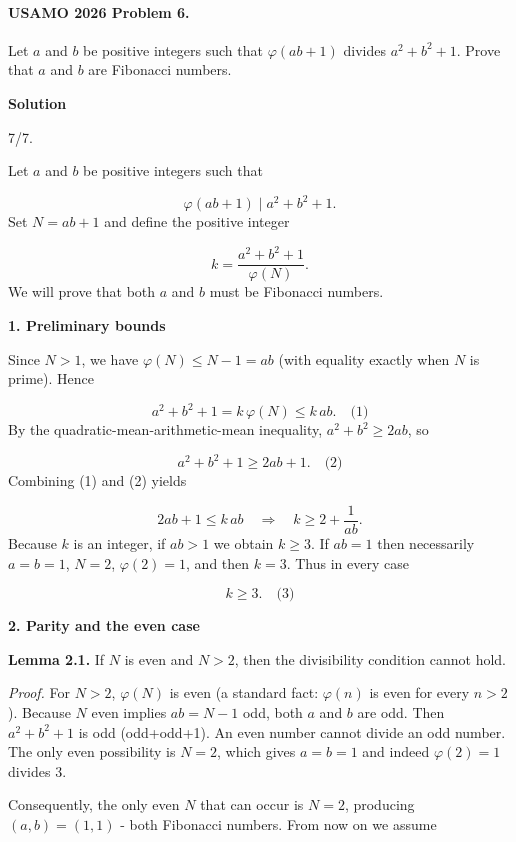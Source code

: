 \documentclass{llmxive}
\providecommand{\solutionheading}[1]{\par\smallskip\noindent\textbf{#1}\par}
\begin{document}
\paragraph{USAMO 2026 Problem 6.}
\begin{mdframed}[style=mdpurplebox,frametitle={USAMO 2026 Problem 6}]
Let $a$ and $b$ be positive integers such that $\varphi(ab+1)$ divides $a^2 + b^2 + 1$. Prove that $a$ and $b$ are Fibonacci numbers.
\end{mdframed}
\solutionheading{Solution}
\begin{remark*}
  7/7.
\end{remark*}
Let \(a\) and \(b\) be positive integers such that\par
\[
\varphi(ab+1) \mid a^{2}+b^{2}+1.
\]
Set \(N = ab+1\) and define the positive integer\par
\[
k = \frac{a^{2}+b^{2}+1}{\varphi(N)}.
\]
We will prove that both \(a\) and \(b\) must be Fibonacci numbers.\par
\smallskip
\solutionheading{1. Preliminary bounds}
Since \(N > 1\), we have \(\varphi(N) \le N-1 = ab\) (with equality exactly when \(N\) is prime). Hence\par
\[
a^{2}+b^{2}+1 = k\,\varphi(N) \le k\,ab. \quad\text{(1)}
\]
By the quadratic-mean-arithmetic-mean inequality, \(a^{2}+b^{2} \ge 2ab\), so\par
\[
a^{2}+b^{2}+1 \ge 2ab+1. \quad\text{(2)}
\]
Combining (1) and (2) yields\par
\[
2ab+1 \le k\,ab \quad\Longrightarrow\quad k \ge 2 + \frac{1}{ab}.
\]
Because \(k\) is an integer, if \(ab > 1\) we obtain \(k \ge 3\). If \(ab = 1\) then necessarily \(a=b=1\), \(N=2\), \(\varphi(2)=1\), and then \(k = 3\). Thus in every case\par
\[
\boxed{k \ge 3}. \quad\text{(3)}
\]
\smallskip
\solutionheading{2. Parity and the even case}
\textbf{Lemma 2.1.} If \(N\) is even and \(N>2\), then the divisibility condition cannot hold.\par
\emph{Proof.} For \(N>2\), \(\varphi(N)\) is even (a standard fact: \(\varphi(n)\) is even for every \(n>2\)). Because \(N\) even implies \(ab = N-1\) odd, both \(a\) and \(b\) are odd. Then \(a^{2}+b^{2}+1\) is odd (odd+odd+1). An even number cannot divide an odd number. The only even possibility is \(N=2\), which gives \(a=b=1\) and indeed \(\varphi(2)=1\) divides \(3\).\par
Consequently, the only even \(N\) that can occur is \(N=2\), producing \((a,b)=(1,1)\) - both Fibonacci numbers. From now on we assume\par
\end{document}
